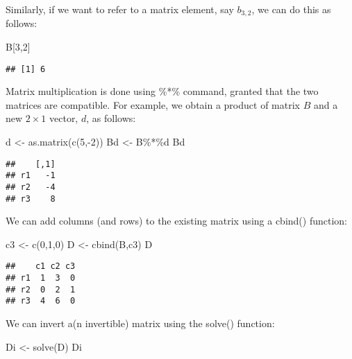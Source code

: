 \documentclass[
  oneside]{book}
\newenvironment{Shaded}{\begin{snugshade}}{\end{snugshade}}
\newcommand{\DecValTok}[1]{\textcolor[rgb]{0.00,0.00,0.81}{#1}}
\newcommand{\FunctionTok}[1]{\textcolor[rgb]{0.00,0.00,0.00}{#1}}
\newcommand{\NormalTok}[1]{#1}
\newcommand{\OtherTok}[1]{\textcolor[rgb]{0.56,0.35,0.01}{#1}}
\newcommand{\SpecialCharTok}[1]{\textcolor[rgb]{0.00,0.00,0.00}{#1}}
\begin{document}
Similarly, if we want to refer to a matrix element, say \(b_{3,2}\), we can do this as follows:

\begin{Shaded}
\begin{Highlighting}[]
\NormalTok{B[}\DecValTok{3}\NormalTok{,}\DecValTok{2}\NormalTok{]}
\end{Highlighting}
\end{Shaded}

\begin{verbatim}
## [1] 6
\end{verbatim}

Matrix multiplication is done using \%*\% command, granted that the two matrices are compatible. For example, we obtain a product of matrix \(B\) and a new \(2 \times 1\) vector, \(d\), as follows:

\begin{Shaded}
\begin{Highlighting}[]
\NormalTok{d }\OtherTok{\textless{}{-}} \FunctionTok{as.matrix}\NormalTok{(}\FunctionTok{c}\NormalTok{(}\DecValTok{5}\NormalTok{,}\SpecialCharTok{{-}}\DecValTok{2}\NormalTok{))}
\NormalTok{Bd }\OtherTok{\textless{}{-}}\NormalTok{ B}\SpecialCharTok{\%*\%}\NormalTok{d}
\NormalTok{Bd}
\end{Highlighting}
\end{Shaded}

\begin{verbatim}
##    [,1]
## r1   -1
## r2   -4
## r3    8
\end{verbatim}

We can add columns (and rows) to the existing matrix using a cbind() function:

\begin{Shaded}
\begin{Highlighting}[]
\NormalTok{c3 }\OtherTok{\textless{}{-}} \FunctionTok{c}\NormalTok{(}\DecValTok{0}\NormalTok{,}\DecValTok{1}\NormalTok{,}\DecValTok{0}\NormalTok{)}
\NormalTok{D }\OtherTok{\textless{}{-}} \FunctionTok{cbind}\NormalTok{(B,c3)}
\NormalTok{D}
\end{Highlighting}
\end{Shaded}

\begin{verbatim}
##    c1 c2 c3
## r1  1  3  0
## r2  0  2  1
## r3  4  6  0
\end{verbatim}

We can invert a(n invertible) matrix using the solve() function:

\begin{Shaded}
\begin{Highlighting}[]
\NormalTok{Di }\OtherTok{\textless{}{-}} \FunctionTok{solve}\NormalTok{(D)}
\NormalTok{Di}
\end{Highlighting}
\end{Shaded}
\end{document}
